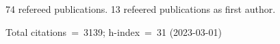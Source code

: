 74 refereed publications. 13 refeered publications as first author.

Total citations~=~3139; h-index~=~31 (2023-03-01)